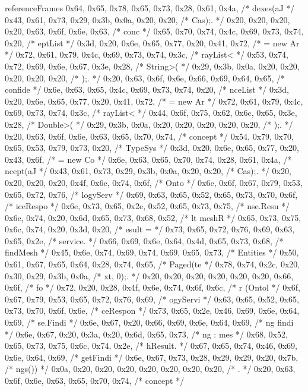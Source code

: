 \begin{chunk}{referenceFrames}
{{{{{0x64, 0x65, 0x78, 0x65, 0x73, 0x28, 0x61, 0x4a, /* dexes(aJ */
0x43, 0x61, 0x73, 0x29, 0x3b, 0x0a, 0x20, 0x20, /* Cas);.   */
0x20, 0x20, 0x20, 0x20, 0x63, 0x6f, 0x6e, 0x63, /*     conc */
0x65, 0x70, 0x74, 0x4c, 0x69, 0x73, 0x74, 0x20, /* eptList  */
0x3d, 0x20, 0x6e, 0x65, 0x77, 0x20, 0x41, 0x72, /* = new Ar */
0x72, 0x61, 0x79, 0x4c, 0x69, 0x73, 0x74, 0x3c, /* rayList< */
0x53, 0x74, 0x72, 0x69, 0x6e, 0x67, 0x3e, 0x28, /* String>( */
0x29, 0x3b, 0x0a, 0x20, 0x20, 0x20, 0x20, 0x20, /* );.      */
0x20, 0x63, 0x6f, 0x6e, 0x66, 0x69, 0x64, 0x65, /*  confide */
0x6e, 0x63, 0x65, 0x4c, 0x69, 0x73, 0x74, 0x20, /* nceList  */
0x3d, 0x20, 0x6e, 0x65, 0x77, 0x20, 0x41, 0x72, /* = new Ar */
0x72, 0x61, 0x79, 0x4c, 0x69, 0x73, 0x74, 0x3c, /* rayList< */
0x44, 0x6f, 0x75, 0x62, 0x6c, 0x65, 0x3e, 0x28, /* Double>( */
0x29, 0x3b, 0x0a, 0x20, 0x20, 0x20, 0x20, 0x20, /* );.      */
0x20, 0x63, 0x6f, 0x6e, 0x63, 0x65, 0x70, 0x74, /*  concept */
0x54, 0x79, 0x70, 0x65, 0x53, 0x79, 0x73, 0x20, /* TypeSys  */
0x3d, 0x20, 0x6e, 0x65, 0x77, 0x20, 0x43, 0x6f, /* = new Co */
0x6e, 0x63, 0x65, 0x70, 0x74, 0x28, 0x61, 0x4a, /* ncept(aJ */
0x43, 0x61, 0x73, 0x29, 0x3b, 0x0a, 0x20, 0x20, /* Cas);.   */
0x20, 0x20, 0x20, 0x20, 0x4f, 0x6e, 0x74, 0x6f, /*     Onto */
0x6c, 0x6f, 0x67, 0x79, 0x53, 0x65, 0x72, 0x76, /* logyServ */
0x69, 0x63, 0x65, 0x52, 0x65, 0x73, 0x70, 0x6f, /* iceRespo */
0x6e, 0x73, 0x65, 0x2e, 0x52, 0x65, 0x73, 0x75, /* nse.Resu */
0x6c, 0x74, 0x20, 0x6d, 0x65, 0x73, 0x68, 0x52, /* lt meshR */
0x65, 0x73, 0x75, 0x6c, 0x74, 0x20, 0x3d, 0x20, /* esult =  */
0x73, 0x65, 0x72, 0x76, 0x69, 0x63, 0x65, 0x2e, /* service. */
0x66, 0x69, 0x6e, 0x64, 0x4d, 0x65, 0x73, 0x68, /* findMesh */
0x45, 0x6e, 0x74, 0x69, 0x74, 0x69, 0x65, 0x73, /* Entities */
0x50, 0x61, 0x67, 0x65, 0x64, 0x28, 0x74, 0x65, /* Paged(te */
0x78, 0x74, 0x2c, 0x20, 0x30, 0x29, 0x3b, 0x0a, /* xt, 0);. */
0x20, 0x20, 0x20, 0x20, 0x20, 0x20, 0x66, 0x6f, /*       fo */
0x72, 0x20, 0x28, 0x4f, 0x6e, 0x74, 0x6f, 0x6c, /* r (Ontol */
0x6f, 0x67, 0x79, 0x53, 0x65, 0x72, 0x76, 0x69, /* ogyServi */
0x63, 0x65, 0x52, 0x65, 0x73, 0x70, 0x6f, 0x6e, /* ceRespon */
0x73, 0x65, 0x2e, 0x46, 0x69, 0x6e, 0x64, 0x69, /* se.Findi */
0x6e, 0x67, 0x20, 0x66, 0x69, 0x6e, 0x64, 0x69, /* ng findi */
0x6e, 0x67, 0x20, 0x3a, 0x20, 0x6d, 0x65, 0x73, /* ng : mes */
0x68, 0x52, 0x65, 0x73, 0x75, 0x6c, 0x74, 0x2e, /* hResult. */
0x67, 0x65, 0x74, 0x46, 0x69, 0x6e, 0x64, 0x69, /* getFindi */
0x6e, 0x67, 0x73, 0x28, 0x29, 0x29, 0x20, 0x7b, /* ngs()) { */
0x0a, 0x20, 0x20, 0x20, 0x20, 0x20, 0x20, 0x20, /* .        */
0x20, 0x63, 0x6f, 0x6e, 0x63, 0x65, 0x70, 0x74, /*  concept */
}}}}}}
\end{chunk}
